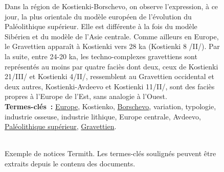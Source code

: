 \begin{figure}
{{          Dans la région de Kostienki-Borschevo, on observe l'expression, à ce
          jour, la plus orientale du modèle européen de l'évolution du
          Paléolithique supérieur. Elle est différente à la fois du modèle
          Sibérien et du modèle de l'Asie centrale. Comme ailleurs en Europe, le
          Gravettien apparaît à Kostienki vers 28 ka (Kostienki 8 /II/). Par la
          suite, entre 24-20 ka, les techno-complexes gravettiens sont
          représentés au moins par quatre faciès dont deux, ceux de Kostienki
          21/III/ et Kostienki 4/II/, ressemblent au Gravettien occidental et
          deux autres, Kostienki-Avdeevo et Kostienki 11/II/, sont des faciès
          propres à l'Europe de l'Est, sans analogie à l'Ouest.\\

          \textbf{Termes-clés~:} \underline{Europe}, Kostienko,
          \underline{Borschevo}, variation, typologie, industrie osseuse,
          industrie lithique, Europe centrale, Avdeevo, \underline{Paléolithique
          supérieur}, \underline{Gravettien}.
        }
      }
      ~\\~\\
      \caption[Exemple de notices Termith]{
        Exemple de notices Termith. Les termes-clés soulignés peuvent être
        extraits depuis le contenu des documents.
        \label{fig:example_inist}
      }
    \end{figure}

